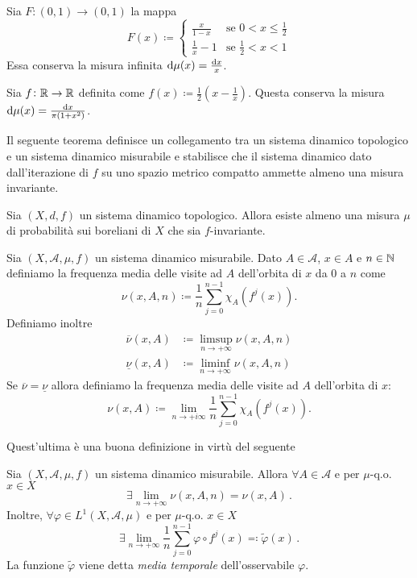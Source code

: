 \begin{exercise}
    Sia $ F\colon (0,1)\to (0,1) $ la mappa
    \[
        F(x) \coloneqq
        \begin{cases}
            \frac{x}{1-x}   & \text{se } 0 < x \leq \frac{1}{2} \\
            \frac{1}{x} - 1 & \text{se } \frac{1}{2} < x < 1
        \end{cases}
    \]
    Essa conserva la misura infinita $ \dif{\mu}(x) = \frac{\dif{x}}{x} $.
\end{exercise}

\begin{exercise}
    Sia $ f\colon \mathbb{R}\to\mathbb{R} $ definita come $ f(x) \coloneqq \frac{1}{2} \left( x - \frac{1}{x} \right) $. Questa conserva la misura $ \dif{\mu}(x) = \frac{\dif{x}}{\pi(1+x^2)} $.
\end{exercise}

Il seguente teorema definisce un collegamento tra un sistema dinamico topologico e un sistema dinamico misurabile e stabilisce che il sistema dinamico dato dall'iterazione di $ f $ su uno spazio metrico compatto ammette almeno una misura invariante. 

\begin{thm}
    Sia $ (X, d, f) $ un sistema dinamico topologico. Allora esiste almeno una misura $ \mu $ di probabilità sui boreliani di $ X $ che sia $ f $-invariante.
\end{thm}

\begin{definition}
    Sia $ (X, \mathcal{A}, \mu, f) $ un sistema dinamico misurabile. Dato $ A \in \mathcal{A} $, $ x \in A $ e $ n \in \mathbb{N} $ definiamo la frequenza media delle visite ad $ A $ dell'orbita di $ x $ da $ 0 $ a $ n $ come
    \[
        \nu(x, A, n) \coloneqq \frac{1}{n} \sum_{j = 0}^{n-1} \chi_A(f^{j}(x)).
    \]
    Definiamo inoltre
    \begin{align*}
        \overline{\nu}(x, A) & \coloneqq \limsup_{n \to +\infty} \nu(x, A, n) \\
        \underline{\nu}(x, A) & \coloneqq \liminf_{n \to +\infty} \nu(x, A, n)
    \end{align*}
    Se $ \overline{\nu} = \underline{\nu} $ allora definiamo la frequenza media delle visite ad $ A $ dell'orbita di $ x $:
    \[
        \nu(x, A) \coloneqq \lim_{n \to +i\infty} \frac{1}{n} \sum_{j = 0}^{n-1} \chi_A(f^{j}(x)).
    \]
\end{definition}
Quest'ultima è una buona definizione in virtù del seguente
\begin{thm}[Birkhoff]\label{thm:Birkhoff}
    Sia $ (X,\mathcal{A},\mu,f) $ un sistema dinamico misurabile. Allora $ \forall A\in\mathcal{A} $ e per $ \mu $-q.o. $ x\in X $
    \[ \exists \lim_{n \to +\infty} \nu(x,A,n) = \nu(x,A) \, . \]
    Inoltre, $ \forall \varphi \in L^1(X,\mathcal{A},\mu) $ e per $ \mu $-q.o. $ x\in X $
    \[ \exists \lim_{n \to +\infty} \frac{1}{n} \sum_{j=0}^{n-1} \varphi\circ f^j(x) \eqqcolon \tilde{\varphi}(x) \, . \]
    La funzione $ \tilde{\varphi} $ viene detta \emph{media temporale} dell'osservabile $ \varphi $.
\end{thm}

